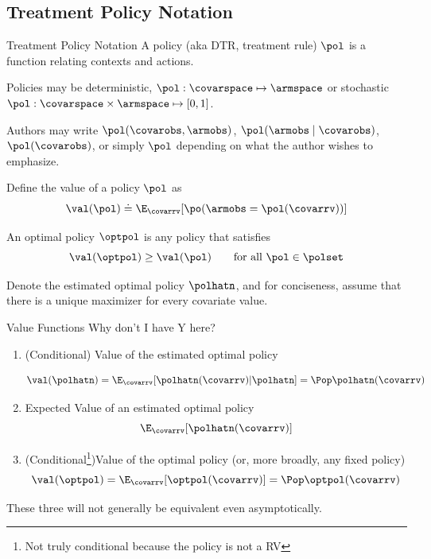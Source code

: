 \documentclass[aspectratio=169, professionalfonts]{beamer}
\begin{document}
\subsection{Treatment Policy Notation}

\begin{frame}{Treatment Policy Notation}
	A policy (aka DTR, treatment rule) $\pol$ is a function relating
	contexts and actions.

	\vfill
	Policies may be deterministic, $\pol: \covarspace
		\mapsto \armspace$ or stochastic
	$\pol: \covarspace \times \armspace \mapsto [0, 1]$.

	\vfill \pause

	Authors may write $\pol(\covarobs,
		\armobs)$, $\pol(\armobs \mid \covarobs)$, $\pol(\covarobs)$, or
	simply $\pol$ depending on what the author wishes to emphasize.

	\vfill \pause
	Define the value of a policy $\pol$ as
	\begin{equation*}
		\val(\pol) \doteq \E_{\covarrv}[\po(\armobs = \pol(\covarrv))]
	\end{equation*}

	\vfill \pause
	An optimal policy $\optpol$ is any policy that satisfies
	\begin{equation*}
		\val(\optpol) \geq \val(\pol) \qquad \text{for all }\pol \in
		\polset
	\end{equation*}

	\vfill \pause
	Denote the estimated optimal policy $\polhatn$, and for conciseness, assume
	that there is a unique maximizer for every covariate value.

\end{frame}

\begin{frame}{Value Functions}
	Why don't I have Y here?
	\begin{enumerate}
		\item (Conditional) Value of the estimated optimal policy

		      $$\val(\polhatn) = \E_{\covarrv}[\polhatn(\covarrv) \vert \polhatn] = \Pop \polhatn(\covarrv)$$

		      \vfill \pause

		\item Expected Value of an estimated optimal policy
		      $$\E_{\covarrv}[\polhatn(\covarrv)]$$

		      \vfill \pause

		\item (Conditional\footnote{Not truly conditional because the
			      policy is not a RV})Value of the optimal policy (or, more broadly, any fixed policy)
		      $$\val(\optpol) = \E_{\covarrv}[\optpol(\covarrv)] = \Pop
			      \optpol(\covarrv)$$
	\end{enumerate}

	\vfill \pause
	These three will not generally be equivalent even asymptotically.
\end{frame}
\end{document}
